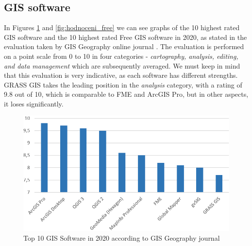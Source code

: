 \documentclass[a4paper,10pt,twoside]{article}
\begin{document}
\subsection{GIS software}
\label{subsection:GIS software}

\noindent In Figures \ref{fig:hodnoceni_all} and \ref{fig:hodnoceni_free} we can see graphs of the 10 highest rated GIS software and the 10 highest rated Free GIS software in 2020, as stated in the evaluation taken by GIS Geography online journal \cite{gisgeography}. The evaluation is performed on a point scale from 0 to 10 in four categories - \textit{cartography, analysis, editing, and data management} which are subsequently averaged. We must keep in mind that this evaluation is very indicative, as each software has different strengths. GRASS GIS takes the leading position in the \textit{analysis} category, with a rating of 9.8 out of 10, which is comparable to FME and ArcGIS Pro, but in other aspects, it loses significantly.

\vspace{0.3cm}
\begin{figure}[hbt!] 
\begin{center}
\includegraphics[width=13cm]{../pictures/hodnoceni_all.png} 
\caption[Top 10 GIS Software in 2020 according to GISGeography journal]{Top 10 GIS Software in 2020 according to GIS Geography journal \cite{gisgeography}}
\label{fig:hodnoceni_all}
\end{center}
\end{figure}
\end{document}
